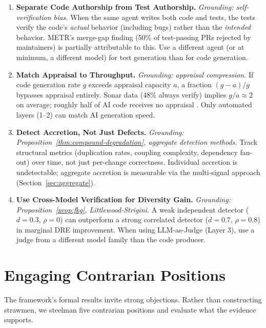 \documentclass[11pt, a4paper, copyright]{googledeepmind}
\begin{document}
\begin{enumerate}[label=\textbf{P\arabic*.}, leftmargin=3em]
\item \textbf{Separate Code Authorship from Test Authorship.}
\emph{Grounding: self-verification bias.}
When the same agent writes both code and tests, the tests verify the code's \emph{actual} behavior (including bugs) rather than the \emph{intended} behavior. METR's merge-gap finding (50\% of test-passing PRs rejected by maintainers) is partially attributable to this. Use a different agent (or at minimum, a different model) for test generation than for code generation.

\item \textbf{Match Appraisal to Throughput.}
\emph{Grounding: appraisal compression.}
If code generation rate $g$ exceeds appraisal capacity $a$, a fraction $(g-a)/g$ bypasses appraisal entirely. Sonar data (48\% always verify) implies $g/a \approx 2$ on average; roughly half of AI code receives no appraisal \citep{sonar2026}. Only automated layers (1--2) can match AI generation speed.

\item \textbf{Detect Accretion, Not Just Defects.}
\emph{Grounding: Proposition~\ref{thm:compound-degradation}, aggregate detection methods.}
Track structural metrics (duplication rates, coupling complexity, dependency fan-out) over time, not just per-change correctness. Individual accretion is undetectable; aggregate accretion is measurable via the multi-signal approach (Section~\ref{sec:aggregate}).

\item \textbf{Use Cross-Model Verification for Diversity Gain.}
\emph{Grounding: Proposition~\ref{prop:fkg}, Littlewood-Strigini.}
A weak independent detector ($d = 0.3$, $\rho = 0$) can outperform a strong correlated detector ($d = 0.7$, $\rho = 0.8$) in marginal DRE improvement. When using LLM-as-Judge (Layer 3), use a judge from a different model family than the code producer.

\end{enumerate}


\section{Engaging Contrarian Positions}
\label{sec:contrarian}

The framework's formal results invite strong objections. Rather than constructing strawmen, we steelman five contrarian positions and evaluate what the evidence supports.
\end{document}
